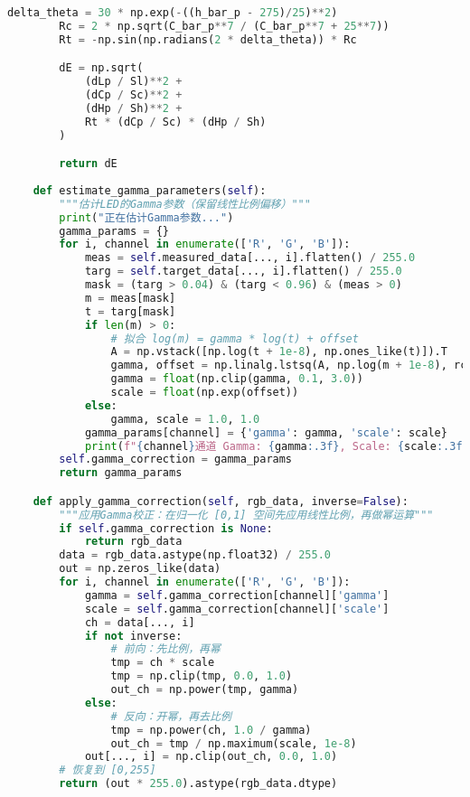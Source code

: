 \begin{lstlisting}[language=Python]
        delta_theta = 30 * np.exp(-((h_bar_p - 275)/25)**2)
        Rc = 2 * np.sqrt(C_bar_p**7 / (C_bar_p**7 + 25**7))
        Rt = -np.sin(np.radians(2 * delta_theta)) * Rc

        dE = np.sqrt(
            (dLp / Sl)**2 +
            (dCp / Sc)**2 +
            (dHp / Sh)**2 +
            Rt * (dCp / Sc) * (dHp / Sh)
        )

        return dE
    
    def estimate_gamma_parameters(self):
        """估计LED的Gamma参数（保留线性比例偏移）"""
        print("正在估计Gamma参数...")
        gamma_params = {}
        for i, channel in enumerate(['R', 'G', 'B']):
            meas = self.measured_data[..., i].flatten() / 255.0
            targ = self.target_data[..., i].flatten() / 255.0
            mask = (targ > 0.04) & (targ < 0.96) & (meas > 0)
            m = meas[mask]
            t = targ[mask]
            if len(m) > 0:
                # 拟合 log(m) = gamma * log(t) + offset
                A = np.vstack([np.log(t + 1e-8), np.ones_like(t)]).T
                gamma, offset = np.linalg.lstsq(A, np.log(m + 1e-8), rcond=None)[0]
                gamma = float(np.clip(gamma, 0.1, 3.0))
                scale = float(np.exp(offset))
            else:
                gamma, scale = 1.0, 1.0
            gamma_params[channel] = {'gamma': gamma, 'scale': scale}
            print(f"{channel}通道 Gamma: {gamma:.3f}, Scale: {scale:.3f}")
        self.gamma_correction = gamma_params
        return gamma_params

    def apply_gamma_correction(self, rgb_data, inverse=False):
        """应用Gamma校正：在归一化 [0,1] 空间先应用线性比例，再做幂运算"""
        if self.gamma_correction is None:
            return rgb_data
        data = rgb_data.astype(np.float32) / 255.0
        out = np.zeros_like(data)
        for i, channel in enumerate(['R', 'G', 'B']):
            gamma = self.gamma_correction[channel]['gamma']
            scale = self.gamma_correction[channel]['scale']
            ch = data[..., i]
            if not inverse:
                # 前向：先比例，再幂
                tmp = ch * scale
                tmp = np.clip(tmp, 0.0, 1.0)
                out_ch = np.power(tmp, gamma)
            else:
                # 反向：开幂，再去比例
                tmp = np.power(ch, 1.0 / gamma)
                out_ch = tmp / np.maximum(scale, 1e-8)
            out[..., i] = np.clip(out_ch, 0.0, 1.0)
        # 恢复到 [0,255]
        return (out * 255.0).astype(rgb_data.dtype)
    

\end{lstlisting}
